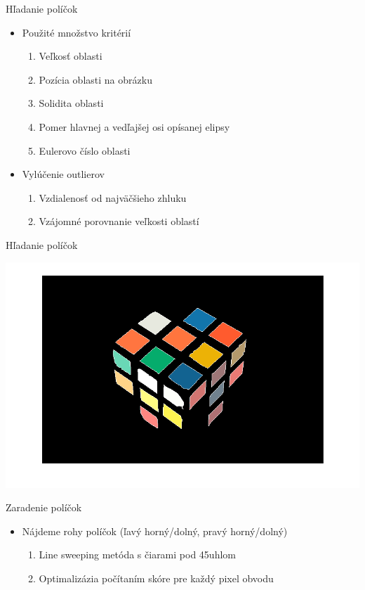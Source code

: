 \documentclass[red]{beamer}
\begin{document}
\begin{frame}{Hľadanie políčok}
\pause
\begin{itemize}
\item Použité množstvo kritérií
\begin{enumerate}[-]
\pause
\item Veľkosť oblasti
\pause
\item Pozícia oblasti na obrázku
\pause
\item Solidita oblasti
\pause
\item Pomer hlavnej a vedľajšej osi opísanej elipsy
\pause
\item Eulerovo číslo oblasti
\end{enumerate}
\end{itemize}

\pause
\begin{itemize}
\item Vylúčenie outlierov
\begin{enumerate}[-]
\pause
\item Vzdialenosť od najväčšieho zhluku
\pause
\item Vzájomné porovnanie veľkosti oblastí
\end{enumerate}
\end{itemize}
\end{frame}



\begin{frame}{Hľadanie políčok}
\centerline{\includegraphics[width=\linewidth]{img/labels}}
\end{frame}



\begin{frame}{Zaradenie políčok}
\pause
\begin{itemize}
\item Nájdeme rohy políčok (ľavý horný/dolný, pravý horný/dolný)
\begin{enumerate}[-]
\pause
\item Line sweeping metóda s čiarami pod 45\textdegree uhlom
\pause
\item Optimalizázia počítaním skóre pre každý pixel obvodu
\end{enumerate}
\end{itemize}
\end{frame}
\end{document}
